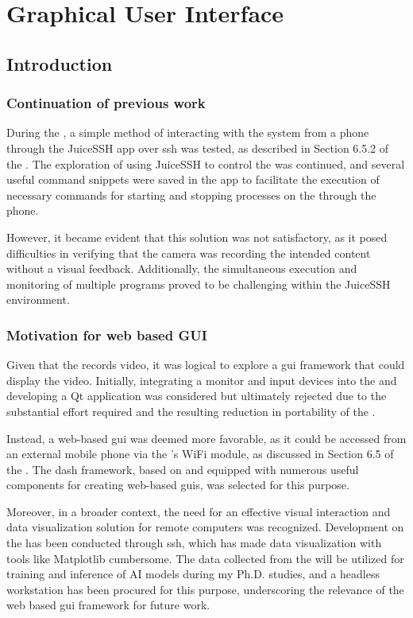 \chapter{Graphical User Interface}

\section{Introduction}
\subsection{Continuation of previous work}
During the \preproject, a simple method of interacting with the system from a phone through the JuiceSSH app over \gls{ssh} was tested, as described in Section 6.5.2 of the \preproject.
The exploration of using JuiceSSH to control the \sr was continued, and several useful command snippets were saved in the app to facilitate the execution of necessary commands for starting and stopping processes on the \jx through the phone.

However, it became evident that this solution was not satisfactory, as it posed difficulties in verifying that the camera was recording the intended content without a visual feedback.
Additionally, the simultaneous execution and monitoring of multiple programs proved to be challenging within the JuiceSSH environment.


\subsection{Motivation for web based GUI}
Given that the \sr records video, it was logical to explore a \gls{gui} framework that could display the video.
Initially, integrating a monitor and input devices into the \sr and developing a Qt application was considered but ultimately rejected due to the substantial effort required and the resulting reduction in portability of the \sr.

Instead, a web-based \gls{gui} was deemed more favorable, as it could be accessed from an external mobile phone via the \sr's WiFi module, as discussed in Section 6.5 of the \preproject.
The \gls{dash} framework, based on \py and equipped with numerous useful components for creating web-based \glspl{gui}, was selected for this purpose.

Moreover, in a broader context, the need for an effective visual interaction and data visualization solution for remote computers was recognized.
Development on the \jx has been conducted through \gls{ssh}, which has made data visualization with tools like Matplotlib cumbersome.
The data collected from the \sr will be utilized for training and inference of AI models during my Ph.D.
studies, and a headless workstation has been procured for this purpose, underscoring the relevance of the web based \gls{gui} framework for future work.


